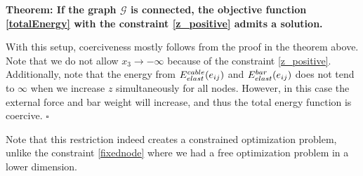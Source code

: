 \textbf{Theorem: If the graph $\mathcal{G}$ is connected, the objective function \eqref{totalEnergy} with the constraint \eqref{z_positive} admits a solution.}

With this setup, coerciveness mostly follows from the proof in the theorem above. Note that we do not allow $x_3 \to -\infty$ because of the constraint \eqref{z_positive}. Additionally, note that the energy from $E^{cable}_{elast}(e_{ij})$ and $E^{bar}_{elast}(e_{ij})$ does not tend to $\infty$ when we increase $z$ simultaneously for all nodes. However, in this case the external force and bar weight will increase, and thus the total energy function is coercive. \hfill $\square$

Note that this restriction indeed creates a constrained optimization problem, unlike the constraint \eqref{fixednode} where we had a free optimization problem in a lower dimension.